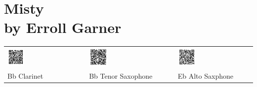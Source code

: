 \chapter[Misty]{Misty \\[1ex]\large{by Erroll Garner}}


\begin{tabular}{p{} p{} p{}  p{} p{}}
  \includegraphics[width=0.25\textwidth]{QR_Codes/QR_Misty_Bb_Clar.png}
  &
  &
  \includegraphics[width=0.25\textwidth]{QR_Codes/QR_Misty_Bb_TenSax.png}
  &
  &
  \includegraphics[width=0.25\textwidth]{QR_Codes/QR_Misty_Eb.png}\\                                                     
   Bb Clarinet
   &
   &
   Bb Tenor Saxophone
   &
   &
   Eb Alto Saxphone\\
\end{tabular}

